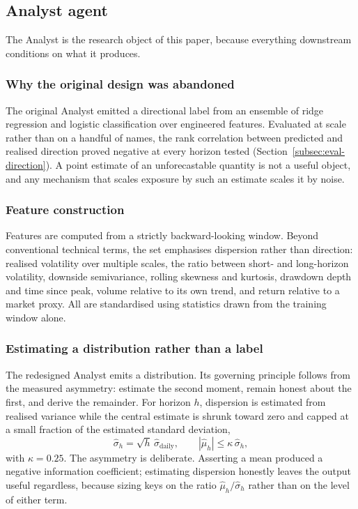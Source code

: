 \documentclass[pdflatex,sn-apa]{sn-jnl}%
\theoremstyle{thmstyleone}%
\theoremstyle{thmstyletwo}%
\theoremstyle{thmstylethree}%
\begin{document}
\subsection{Analyst agent}\label{subsec:analyst}

The Analyst is the research object of this paper, because everything downstream
conditions on what it produces.

\subsubsection{Why the original design was abandoned}\label{subsubsec:wrong-target}

The original Analyst emitted a directional label from an ensemble of ridge
regression and logistic classification over engineered features. Evaluated at
scale rather than on a handful of names, the rank correlation between predicted
and realised direction proved negative at every horizon tested
(Section~\ref{subsec:eval-direction}). A point estimate of an unforecastable
quantity is not a useful object, and any mechanism that scales exposure by such
an estimate scales it by noise.

\subsubsection{Feature construction}\label{subsubsec:features}

Features are computed from a strictly backward-looking window. Beyond
conventional technical terms, the set emphasises dispersion rather than
direction: realised volatility over multiple scales, the ratio between short-
and long-horizon volatility, downside semivariance, rolling skewness and
kurtosis, drawdown depth and time since peak, volume relative to its own trend,
and return relative to a market proxy. All are standardised using statistics
drawn from the training window alone.

\subsubsection{Estimating a distribution rather than a label}\label{subsubsec:distribution}

The redesigned Analyst emits a distribution. Its governing principle follows
from the measured asymmetry: estimate the second moment, remain honest about
the first, and derive the remainder. For horizon $h$, dispersion is estimated
from realised variance while the central estimate is shrunk toward zero and
capped at a small fraction of the estimated standard deviation,
\begin{equation}\label{eq:dist}
\hat{\sigma}_h = \sqrt{h}\,\hat{\sigma}_{\text{daily}},
\qquad
|\hat{\mu}_h| \leq \kappa\,\hat{\sigma}_h,
\end{equation}
with $\kappa = 0.25$. The asymmetry is deliberate. Asserting a mean produced a
negative information coefficient; estimating dispersion honestly leaves the
output useful regardless, because sizing keys on the ratio
$\hat{\mu}_h/\hat{\sigma}_h$ rather than on the level of either term.
\end{document}
